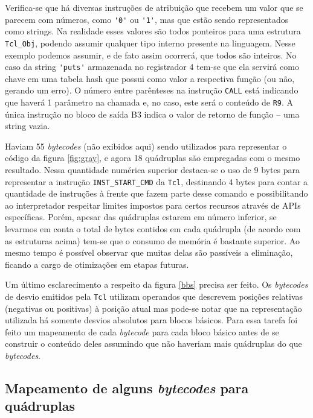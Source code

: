 Verifica-se que há diversas instruções de atribuição que recebem um
valor que se parecem com números, como \verb!'0'! ou \verb!'1'!, mas
que estão sendo representados como strings. Na realidade esses valores
são todos ponteiros para uma estrutura \verb!Tcl_Obj!, podendo assumir
qualquer tipo interno presente na linguagem. Nesse exemplo podemos
assumir, e de fato assim ocorrerá, que todos são inteiros. No caso da
string \verb!'puts'! armazenada no registrador 4 tem-se que ela
servirá como chave em uma tabela hash que possui como valor a
respectiva função (ou não, gerando um erro). O número entre parênteses
na instrução \verb!CALL!
está indicando que haverá 1 parâmetro na chamada e, no caso, este será o
conteúdo de \verb!R9!. A única instrução no bloco de saída B3 indica o
valor de retorno de função -- uma string vazia.

Haviam 55 \textit{bytecodes} (não exibidos aqui) sendo utilizados para
representar o código da figura \ref{fig:gray}, e agora 18 quádruplas
são empregadas com o mesmo resultado. Nessa quantidade numérica
superior destaca-se o uso de 9 bytes para representar a instrução
\verb!INST_START_CMD! da \texttt{Tcl}, destinando 4 bytes para contar
a quantidade de instruções à frente que fazem parte desse comando e
possibilitando ao interpretador respeitar limites impostos para certos
recursos através de
APIs específicas. Porém, apesar das quádruplas estarem em número inferior,
se levarmos em conta o total de bytes contidos em cada quádrupla (de
acordo com as estruturas acima) tem-se que
o consumo de memória é bastante superior. Ao mesmo tempo é possível
observar que muitas delas são passíveis a eliminação, ficando a cargo
de otimizações em etapas futuras.

Um último esclarecimento a respeito da figura \ref{bbs} precisa ser feito.
Os \textit{bytecodes} de desvio emitidos pela \texttt{Tcl} utilizam
operandos que descrevem posições relativas (negativas ou positivas) à
posição atual mas pode-se notar que na
representação utilizada há somente desvios absolutos para blocos
básicos. Para essa tarefa foi feito um mapeamento de cada
\textit{bytecode} para cada bloco básico antes de se construir o
conteúdo deles assumindo que não haveriam mais quádruplas do que
\textit{bytecodes}.

\subsection{Mapeamento de alguns \textit{bytecodes} para quádruplas}

